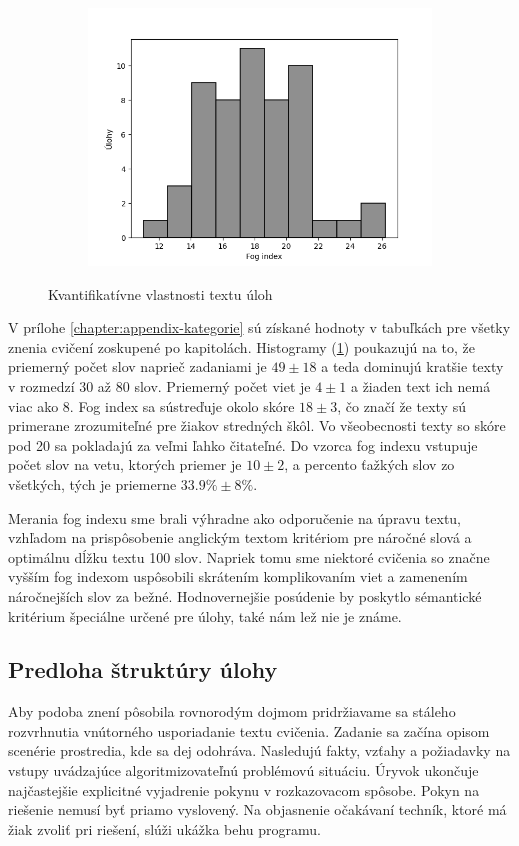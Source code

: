 \begin{figure}[h]
\begin{subfigure}[b]{0.32\textwidth}
\includegraphics[width=\textwidth]{assets/fog.png}
\end{subfigure}
\hfill
\caption{Kvantifikatívne vlastnosti textu úloh}
\label{fig:text-metrics}
\end{figure}

V prílohe \ref{chapter:appendix-kategorie} sú získané hodnoty v tabuľkách pre všetky znenia cvičení zoskupené po kapitolách. Histogramy (\ref{fig:text-metrics}) poukazujú na to, že priemerný počet slov naprieč zadaniami je $49 \pm 18$ a teda dominujú kratšie texty v rozmedzí $30$ až $80$ slov. Priemerný počet viet je $4 \pm 1$ a žiaden text ich nemá viac ako $8$. Fog index sa sústreďuje okolo skóre $18 \pm 3$, čo značí že texty sú primerane zrozumiteľné pre žiakov stredných škôl. Vo všeobecnosti texty so skóre pod 20 sa pokladajú za veľmi ľahko čitateľné. Do vzorca fog indexu vstupuje počet slov na vetu, ktorých priemer je $10 \pm 2$, a percento ťažkých slov zo všetkých, tých je priemerne $33.9\% \pm 8\%$.

Merania fog indexu sme brali výhradne ako odporučenie na úpravu textu, vzhľadom na prispôsobenie anglickým textom kritériom pre náročné slová a optimálnu dĺžku textu 100 slov. Napriek tomu sme niektoré cvičenia so značne vyšším fog indexom uspôsobili skrátením komplikovaním viet a zamenením náročnejších slov za bežné. Hodnovernejšie posúdenie by poskytlo sémantické kritérium špeciálne určené pre úlohy, také nám lež nie je známe.

\subsection{Predloha štruktúry úlohy}
Aby podoba znení pôsobila rovnorodým dojmom pridržiavame sa stáleho rozvrhnutia vnútorného usporiadanie textu cvičenia. Zadanie sa začína opisom scenérie prostredia, kde sa dej odohráva. Nasledujú fakty, vzťahy a požiadavky na vstupy uvádzajúce algoritmizovateľnú problémovú situáciu. Úryvok ukončuje najčastejšie explicitné vyjadrenie pokynu v rozkazovacom spôsobe. Pokyn na riešenie nemusí byť priamo vyslovený. Na objasnenie očakávaní techník, ktoré má žiak zvoliť pri riešení, slúži ukážka behu programu.

